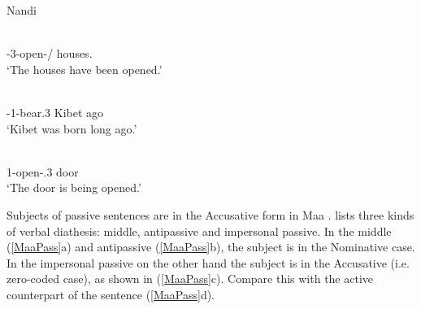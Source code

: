 \begin{exe}\ex\label{NanPass} {Nandi} \citep[125, 126]{Creider:1989}\nopagebreak[4]
\begin{xlist}\ex\gll{} \textbf{}\\
\pst{}-3-open-\stat{}/\pass{} houses.\nom{}\\
`The houses have been opened.'%

\ex\gll{}   \\
\pst{}-1\pl{}-bear.3 Kibet ago\\
`Kibet was born long ago.'

\ex\gll{} \\
1\pl{}-open-\ipfv{}.3 door\\
`The door is being opened.' 
\end{xlist}%
\end{exe}


Subjects of passive sentences are in the Accusative form in Maa .
\citet{Payne:2007} lists three kinds of verbal diathesis: middle, antipassive and impersonal passive.
In the middle (\ref{MaaPass}a) and antipassive (\ref{MaaPass}b), the subject is in the Nominative  case. 
In the impersonal passive on the other hand the subject is in the Accusative (i.e. zero-coded case), as shown in (\ref{MaaPass}c). 
Compare this with the active counterpart of the sentence (\ref{MaaPass}d).

